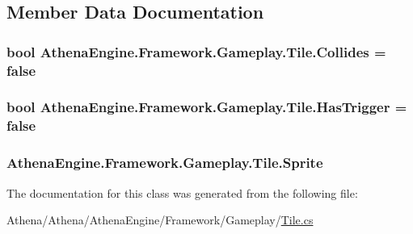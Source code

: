 \subsection{Member Data Documentation}
\hypertarget{class_athena_engine_1_1_framework_1_1_gameplay_1_1_tile_aaa1943b0ddb6d4371980934b0d931ef7}{
\subsubsection[{Collides}]{\setlength{\rightskip}{0pt plus 5cm}bool Athena\-Engine.\-Framework.\-Gameplay.\-Tile.\-Collides = false}}\label{class_athena_engine_1_1_framework_1_1_gameplay_1_1_tile_aaa1943b0ddb6d4371980934b0d931ef7}
\hypertarget{class_athena_engine_1_1_framework_1_1_gameplay_1_1_tile_a4265d7725c1393ad8eaa17b4e8b5ff05}{
\subsubsection[{Has\-Trigger}]{\setlength{\rightskip}{0pt plus 5cm}bool Athena\-Engine.\-Framework.\-Gameplay.\-Tile.\-Has\-Trigger = false}}\label{class_athena_engine_1_1_framework_1_1_gameplay_1_1_tile_a4265d7725c1393ad8eaa17b4e8b5ff05}
\hypertarget{class_athena_engine_1_1_framework_1_1_gameplay_1_1_tile_aa98f08e02a32fdcc3455d297baa1a5fd}{
\subsubsection[{Sprite}]{ Athena\-Engine.\-Framework.\-Gameplay.\-Tile.\-Sprite}}\label{class_athena_engine_1_1_framework_1_1_gameplay_1_1_tile_aa98f08e02a32fdcc3455d297baa1a5fd}


The documentation for this class was generated from the following file\-:\begin{DoxyCompactItemize}
\item 
Athena/\-Athena/\-Athena\-Engine/\-Framework/\-Gameplay/\hyperlink{_tile_8cs}{Tile.\-cs}\end{DoxyCompactItemize}
